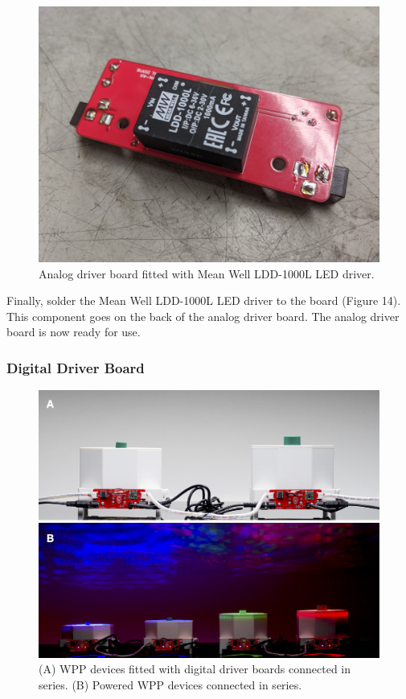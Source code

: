 \documentclass[11pt]{article}
\begin{document}
\begin{figure}[H]
	\centering
	\includegraphics[width=\textwidth/2]{"./fig14.jpg"}
	\caption{Analog driver board fitted with Mean Well LDD-1000L LED driver.}
\end{figure}

Finally, solder the Mean Well LDD-1000L LED driver to the board (Figure 14).
This component goes on the back of the analog driver board.
The analog driver board is now ready for use.



\subsubsection{Digital Driver Board} \label{SEC:digital-driver}

\begin{figure}[H]
  \centering
  \includegraphics[width=\textwidth]{"./fig15.png"}
  \caption{(A) WPP devices fitted with digital driver boards connected in series. (B) Powered WPP devices connected in series.}
  \label{FIG:digital-driver-network}
\end{figure}
\end{document}
